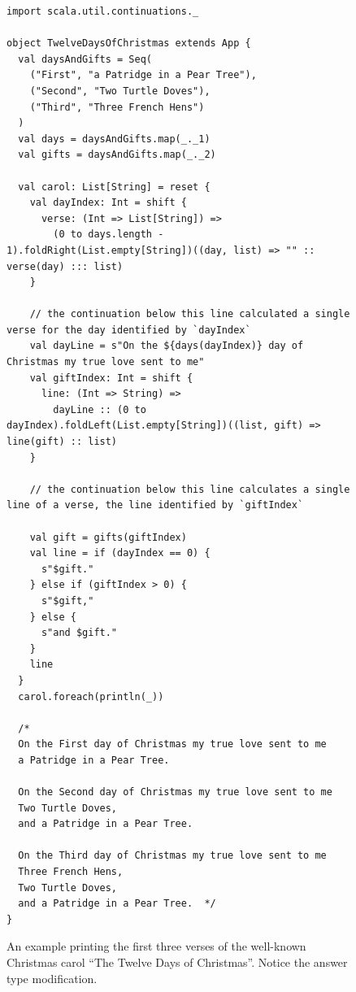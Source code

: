 \begin{figure}[h!] 
\begin{lstlisting}
import scala.util.continuations._

object TwelveDaysOfChristmas extends App {
  val daysAndGifts = Seq(
    ("First", "a Patridge in a Pear Tree"),
    ("Second", "Two Turtle Doves"),
    ("Third", "Three French Hens")
  )
  val days = daysAndGifts.map(_._1)
  val gifts = daysAndGifts.map(_._2)

  val carol: List[String] = reset {
    val dayIndex: Int = shift {
      verse: (Int => List[String]) =>
        (0 to days.length - 1).foldRight(List.empty[String])((day, list) => "" :: verse(day) ::: list)
    }

    // the continuation below this line calculated a single verse for the day identified by `dayIndex`
    val dayLine = s"On the ${days(dayIndex)} day of Christmas my true love sent to me"
    val giftIndex: Int = shift {
      line: (Int => String) =>
        dayLine :: (0 to dayIndex).foldLeft(List.empty[String])((list, gift) => line(gift) :: list)
    }

    // the continuation below this line calculates a single line of a verse, the line identified by `giftIndex`

    val gift = gifts(giftIndex)
    val line = if (dayIndex == 0) {
      s"$gift."
    } else if (giftIndex > 0) {
      s"$gift,"
    } else {
      s"and $gift."
    }
    line
  }
  carol.foreach(println(_))

  /*
  On the First day of Christmas my true love sent to me
  a Patridge in a Pear Tree.

  On the Second day of Christmas my true love sent to me
  Two Turtle Doves,
  and a Patridge in a Pear Tree.

  On the Third day of Christmas my true love sent to me
  Three French Hens,
  Two Turtle Doves,
  and a Patridge in a Pear Tree.  */
}
\end{lstlisting}
\caption{An example printing the first three verses of the well-known Christmas carol ``The Twelve Days of Christmas''. Notice the answer type modification.}
\label{fig:example_twelve_days}
\end{figure}






